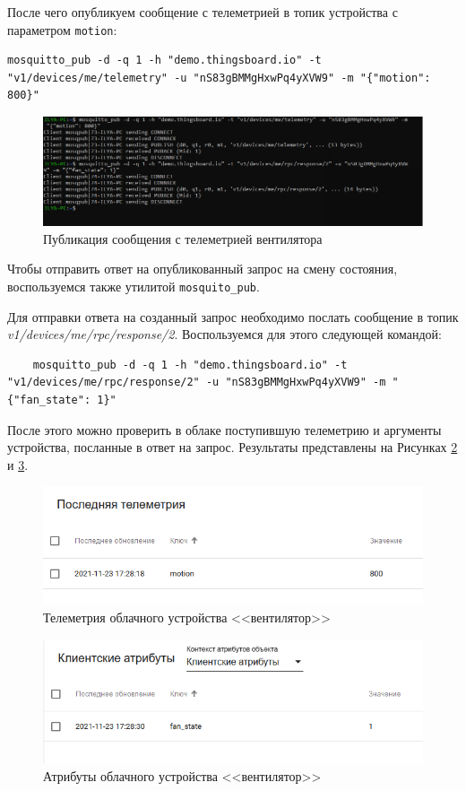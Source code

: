 \documentclass[a4paper,14pt]{extarticle}
\begin{document}
После чего опубликуем сообщение с телеметрией в топик устройства с параметром
\texttt{motion}:

\begin{lstlisting}
mosquitto_pub -d -q 1 -h "demo.thingsboard.io" -t "v1/devices/me/telemetry" -u "nS83gBMMgHxwPq4yXVW9" -m "{"motion": 800}"
\end{lstlisting}

\begin{figure}[h!]
	\centering
	\includegraphics[width=0.6\linewidth]{images/t1-sender}
	\caption{Публикация сообщения с телеметрией вентилятора}
	\label{fig:t1-sender}
\end{figure}

Чтобы отправить ответ на опубликованный запрос на смену состояния, воспользуемся
также утилитой \texttt{mosquito\_pub}.

Для отправки ответа на созданный запрос необходимо послать сообщение в топик
\textit{v1/devices/me/rpc/response/2}. Воспользуемся для этого следующей командой:

\begin{lstlisting}
	mosquitto_pub -d -q 1 -h "demo.thingsboard.io" -t "v1/devices/me/rpc/response/2" -u "nS83gBMMgHxwPq4yXVW9" -m "{"fan_state": 1}"
\end{lstlisting}

После этого можно проверить в облаке поступившую телеметрию и аргументы устройства,
посланные в ответ на запрос. Результаты представлены на Рисунках \ref{fig:tel} и \ref{fig:attr}.

\begin{figure}[h!]
	\centering
	\includegraphics[width=0.6\linewidth]{images/tel}
	\caption{Телеметрия облачного устройства <<вентилятор>>}
	\label{fig:tel}
\end{figure}


\begin{figure}[h!]
	\centering
	\includegraphics[width=0.6\linewidth]{images/attr}
	\caption{Атрибуты облачного устройства <<вентилятор>>}
	\label{fig:attr}
\end{figure}
\end{document}

